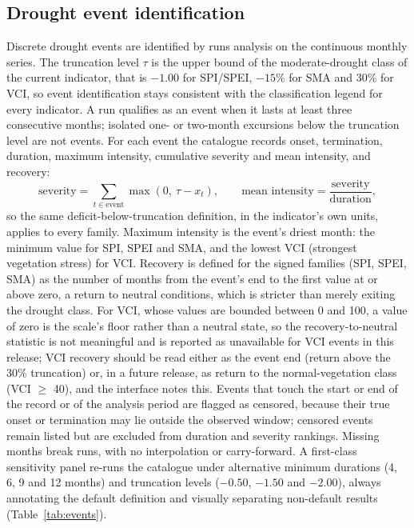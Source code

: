 \documentclass[10pt,a4paper]{article}
\begin{document}
\subsection*{Drought event identification}
Discrete drought events are identified by runs analysis on the continuous monthly series\citep{Yevjevich1967}. The truncation level $\tau$ is the upper bound of the moderate-drought class of the current indicator, that is $-1.00$ for SPI/SPEI, $-15$\% for SMA and 30\% for VCI, so event identification stays consistent with the classification legend for every indicator. A run qualifies as an event when it lasts at least three consecutive months; isolated one- or two-month excursions below the truncation level are not events. For each event the catalogue records onset, termination, duration, maximum intensity, cumulative severity and mean intensity, and recovery:
\[
\text{severity}=\sum_{t\in \text{event}} \max\!\left(0,\ \tau-x_t\right),\qquad
\text{mean intensity}=\frac{\text{severity}}{\text{duration}},
\]
so the same deficit-below-truncation definition, in the indicator's own units, applies to every family. Maximum intensity is the event's driest month: the minimum value for SPI, SPEI and SMA, and the lowest VCI (strongest vegetation stress) for VCI. Recovery is defined for the signed families (SPI, SPEI, SMA) as the number of months from the event's end to the first value at or above zero, a return to neutral conditions, which is stricter than merely exiting the drought class. For VCI, whose values are bounded between 0 and 100, a value of zero is the scale's floor rather than a neutral state, so the recovery-to-neutral statistic is not meaningful and is reported as unavailable for VCI events in this release; VCI recovery should be read either as the event end (return above the 30\% truncation) or, in a future release, as return to the normal-vegetation class (VCI $\ge$ 40), and the interface notes this. Events that touch the start or end of the record or of the analysis period are flagged as censored, because their true onset or termination may lie outside the observed window; censored events remain listed but are excluded from duration and severity rankings. Missing months break runs, with no interpolation or carry-forward. A first-class sensitivity panel re-runs the catalogue under alternative minimum durations (4, 6, 9 and 12 months) and truncation levels ($-0.50$, $-1.50$ and $-2.00$), always annotating the default definition and visually separating non-default results (Table~\ref{tab:events}).
\end{document}
